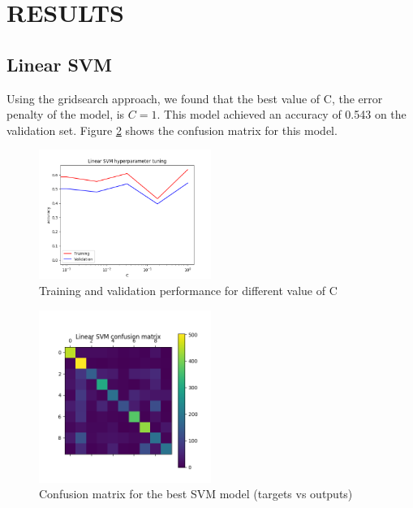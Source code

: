 \documentclass[letterpaper, 10 pt, conference]{ieeeconf}  %
\begin{document}
\section{RESULTS}

\subsection{Linear SVM}
Using the gridsearch approach, we found that the best value of C, the error penalty of the model, is $C=1$. This model achieved an accuracy of 0.543 on the validation set. Figure \ref{fig:svmconf} shows the confusion matrix for this model.

\begin{figure}[h]
	\begin{center}
			\includegraphics[width=0.5\textwidth]{figures/svm_tuning.png}  %
		\caption{Training and validation performance for different value of C}
		\label{fig:svmtuning}
	\end{center}
\end{figure}
\begin{figure}[h]
	\begin{center}
			\includegraphics[width=0.5\textwidth]{figures/svm_conf.png}  %
		\caption{Confusion matrix for the best SVM model (targets vs outputs)}
		\label{fig:svmconf}
	\end{center}
\end{figure}
\end{document}
